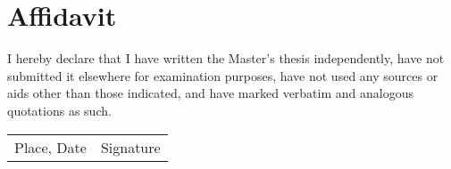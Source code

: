 \chapter*{Affidavit}
I hereby declare that I have written the Master's thesis independently, have not submitted it elsewhere for examination purposes, have not used any sources or aids other than those indicated, and have marked verbatim and analogous quotations as such.

\vspace{0.8in}
\begin{tabular}{p{2in}p{2in}}
\hline
\vspace{0pt} Place, Date & \vspace{0pt} Signature \\
\end{tabular}